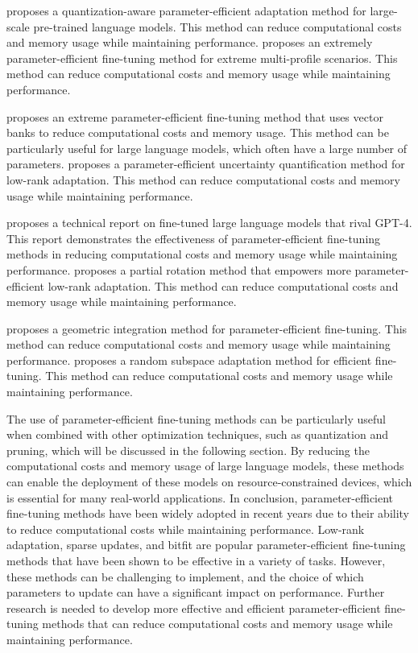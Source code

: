 \documentclass[11pt]{article}
\begin{document}
\cite{ref129} proposes a quantization-aware parameter-efficient adaptation method for large-scale pre-trained language models. This method can reduce computational costs and memory usage while maintaining performance. \cite{ref130} proposes an extremely parameter-efficient fine-tuning method for extreme multi-profile scenarios. This method can reduce computational costs and memory usage while maintaining performance.

\cite{ref131} proposes an extreme parameter-efficient fine-tuning method that uses vector banks to reduce computational costs and memory usage. This method can be particularly useful for large language models, which often have a large number of parameters. \cite{ref132} proposes a parameter-efficient uncertainty quantification method for low-rank adaptation. This method can reduce computational costs and memory usage while maintaining performance.

\cite{ref133} proposes a technical report on fine-tuned large language models that rival GPT-4. This report demonstrates the effectiveness of parameter-efficient fine-tuning methods in reducing computational costs and memory usage while maintaining performance. \cite{ref134} proposes a partial rotation method that empowers more parameter-efficient low-rank adaptation. This method can reduce computational costs and memory usage while maintaining performance.

\cite{ref135} proposes a geometric integration method for parameter-efficient fine-tuning. This method can reduce computational costs and memory usage while maintaining performance. \cite{ref136} proposes a random subspace adaptation method for efficient fine-tuning. This method can reduce computational costs and memory usage while maintaining performance.

The use of parameter-efficient fine-tuning methods can be particularly useful when combined with other optimization techniques, such as quantization and pruning, which will be discussed in the following section. By reducing the computational costs and memory usage of large language models, these methods can enable the deployment of these models on resource-constrained devices, which is essential for many real-world applications. In conclusion, parameter-efficient fine-tuning methods have been widely adopted in recent years due to their ability to reduce computational costs while maintaining performance. Low-rank adaptation, sparse updates, and bitfit are popular parameter-efficient fine-tuning methods that have been shown to be effective in a variety of tasks. However, these methods can be challenging to implement, and the choice of which parameters to update can have a significant impact on performance. Further research is needed to develop more effective and efficient parameter-efficient fine-tuning methods that can reduce computational costs and memory usage while maintaining performance.
\end{document}
